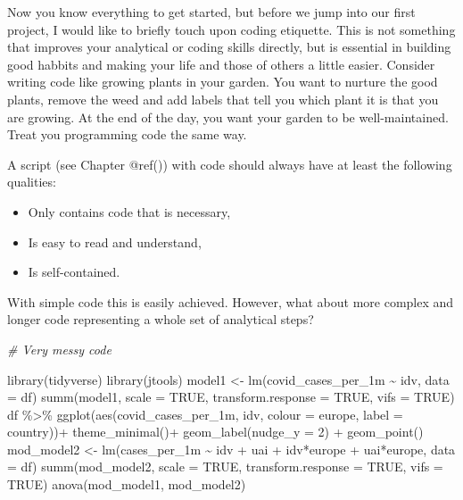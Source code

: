 \documentclass[
]{book}
\newenvironment{Shaded}{\begin{snugshade}}{\end{snugshade}}
\newcommand{\AttributeTok}[1]{\textcolor[rgb]{0.77,0.63,0.00}{#1}}
\newcommand{\CommentTok}[1]{\textcolor[rgb]{0.56,0.35,0.01}{\textit{#1}}}
\newcommand{\ConstantTok}[1]{\textcolor[rgb]{0.00,0.00,0.00}{#1}}
\newcommand{\DecValTok}[1]{\textcolor[rgb]{0.00,0.00,0.81}{#1}}
\newcommand{\FunctionTok}[1]{\textcolor[rgb]{0.00,0.00,0.00}{#1}}
\newcommand{\NormalTok}[1]{#1}
\newcommand{\OtherTok}[1]{\textcolor[rgb]{0.56,0.35,0.01}{#1}}
\newcommand{\SpecialCharTok}[1]{\textcolor[rgb]{0.00,0.00,0.00}{#1}}
\begin{document}
Now you know everything to get started, but before we jump into our first project, I would like to briefly touch upon coding etiquette. This is not something that improves your analytical or coding skills directly, but is essential in building good habbits and making your life and those of others a little easier. Consider writing code like growing plants in your garden. You want to nurture the good plants, remove the weed and add labels that tell you which plant it is that you are growing. At the end of the day, you want your garden to be well-maintained. Treat you programming code the same way.

A script (see Chapter @ref()) with code should always have at least the following qualities:

\begin{itemize}
\item
  Only contains code that is necessary,
\item
  Is easy to read and understand,
\item
  Is self-contained.
\end{itemize}

With simple code this is easily achieved. However, what about more complex and longer code representing a whole set of analytical steps?

\begin{Shaded}
\begin{Highlighting}[]
\CommentTok{\# Very messy code}

\FunctionTok{library}\NormalTok{(tidyverse)}
\FunctionTok{library}\NormalTok{(jtools)}
\NormalTok{model1 }\OtherTok{\textless{}{-}} \FunctionTok{lm}\NormalTok{(covid\_cases\_per\_1m }\SpecialCharTok{\textasciitilde{}}\NormalTok{ idv, }\AttributeTok{data =}\NormalTok{ df)}
\FunctionTok{summ}\NormalTok{(model1, }\AttributeTok{scale =} \ConstantTok{TRUE}\NormalTok{, }\AttributeTok{transform.response =} \ConstantTok{TRUE}\NormalTok{, }\AttributeTok{vifs =} \ConstantTok{TRUE}\NormalTok{)}
\NormalTok{df }\SpecialCharTok{\%\textgreater{}\%} \FunctionTok{ggplot}\NormalTok{(}\FunctionTok{aes}\NormalTok{(covid\_cases\_per\_1m, idv, }\AttributeTok{colour =}\NormalTok{ europe, }\AttributeTok{label =}\NormalTok{ country))}\SpecialCharTok{+}
\FunctionTok{theme\_minimal}\NormalTok{()}\SpecialCharTok{+} \FunctionTok{geom\_label}\NormalTok{(}\AttributeTok{nudge\_y =} \DecValTok{2}\NormalTok{) }\SpecialCharTok{+} \FunctionTok{geom\_point}\NormalTok{()}
\NormalTok{mod\_model2 }\OtherTok{\textless{}{-}} \FunctionTok{lm}\NormalTok{(cases\_per\_1m }\SpecialCharTok{\textasciitilde{}}\NormalTok{ idv }\SpecialCharTok{+}\NormalTok{ uai }\SpecialCharTok{+}\NormalTok{ idv}\SpecialCharTok{*}\NormalTok{europe }\SpecialCharTok{+}\NormalTok{ uai}\SpecialCharTok{*}\NormalTok{europe, }\AttributeTok{data =}\NormalTok{ df)}
\FunctionTok{summ}\NormalTok{(mod\_model2, }\AttributeTok{scale =} \ConstantTok{TRUE}\NormalTok{, }\AttributeTok{transform.response =} \ConstantTok{TRUE}\NormalTok{, }\AttributeTok{vifs =} \ConstantTok{TRUE}\NormalTok{)}
\FunctionTok{anova}\NormalTok{(mod\_model1, mod\_model2)}
\end{Highlighting}
\end{Shaded}
\end{document}
